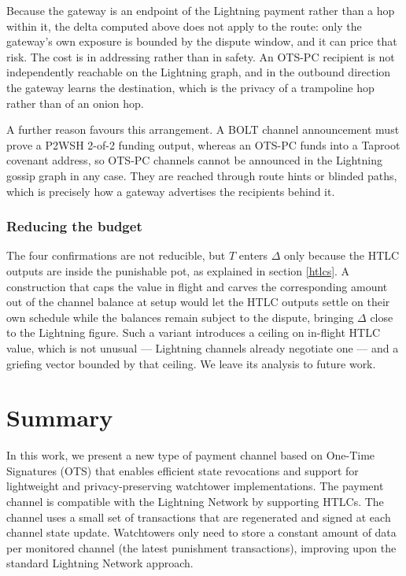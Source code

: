 \documentclass[11pt,a4paper]{article}
\begin{document}
Because the gateway is an endpoint of the Lightning payment rather than a hop within it, the delta computed above does not apply to the route: only the gateway's own exposure is bounded by the dispute window, and it can price that risk. The cost is in addressing rather than in safety. An OTS-PC recipient is not independently reachable on the Lightning graph, and in the outbound direction the gateway learns the destination, which is the privacy of a trampoline hop rather than of an onion hop.

A further reason favours this arrangement. A BOLT channel announcement must prove a P2WSH 2-of-2 funding output, whereas an OTS-PC funds into a Taproot covenant address, so OTS-PC channels cannot be announced in the Lightning gossip graph in any case. They are reached through route hints or blinded paths, which is precisely how a gateway advertises the recipients behind it.

\subsubsection{Reducing the budget}

The four confirmations are not reducible, but $T$ enters $\Delta$ only because the HTLC outputs are inside the punishable pot, as explained in section \ref{htlcs}. A construction that caps the value in flight and carves the corresponding amount out of the channel balance at setup would let the HTLC outputs settle on their own schedule while the balances remain subject to the dispute, bringing $\Delta$ close to the Lightning figure. Such a variant introduces a ceiling on in-flight HTLC value, which is not unusual --- Lightning channels already negotiate one --- and a griefing vector bounded by that ceiling. We leave its analysis to future work.

\section{Summary}

In this work, we present a new type of payment channel based on One-Time Signatures (OTS) that enables efficient state revocations and support for lightweight and privacy-preserving watchtower implementations. The payment channel is compatible with the Lightning Network by supporting HTLCs. The channel uses a small set of transactions that are regenerated and signed at each channel state update. Watchtowers only need to store a constant amount of data per monitored channel (the latest punishment transactions), improving upon the standard Lightning Network approach. 



\appendix


\end{document}
